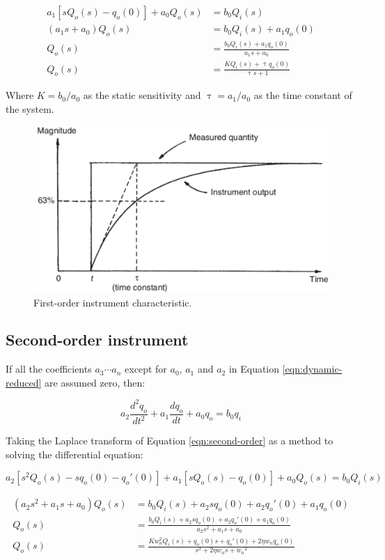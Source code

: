 \documentclass[a4paper,11pt]{book}
\begin{document}
\begin{align}
a_1 \left[ s Q_o(s) - q_o(0) \right] + a_0 Q_o(s) &= b_0 Q_i(s) \\ 
( a_1 s + a_0 ) Q_o(s) &= b_0 Q_i(s) + a_1 q_o(0) \\
Q_o(s) &= \frac{ b_0 Q_i(s) + a_1 q_o(0) }{ a_1 s + a_0 } \\
Q_o(s) &= \frac{ K Q_i(s) + \uptau q_o(0) }{ \uptau s + 1} \label{eqn:first-order-laplace}
\end{align}

Where $K = b_0/a_0$ as the static sensitivity and $\uptau = a_1/a_0$ as the time constant of the system.

\begin{figure}[h!]\label{fig:first-order}
\centering
  \includegraphics[width=0.7\linewidth]{first-order}
  \caption{First-order instrument characteristic.} 
\end{figure}

\subsection*{Second-order instrument}

If all the coefficients $a_3 \cdots a_n$ except for $a_0$, $a_1$ and $a_2$ in Equation \ref{eqn:dynamic-reduced} are assumed zero, then: 

\begin{equation}\label{eqn:second-order}
a_2 \frac{d^2q_o}{dt^2} + a_1 \frac{dq_o}{dt} + a_0 q_o = b_0 q_i  
\end{equation}

Taking the Laplace transform of Equation \ref{eqn:second-order} as a method to solving the differential equation:

\begin{equation}
a_2 \left[ s^2 Q_o(s) - s q_o(0) - q_o'(0) \right] + a_1 \left[ sQ_o(s) - q_o(0) \right] + a_0Q_o(s) = b_0 Q_i(s) 
\end{equation}

\begin{align} 
(a_2 s^2 + a_1 s + a_0 ) Q_o(s) &= b_0 Q_i(s) + a_2sq_o(0) + a_2 q_o'(0) + a_1 q_o(0) \\
Q_o(s) &= \frac{ b_0 Q_i(s) + a_2sq_o(0) + a_2 q_o'(0) + a_1 q_o(0) }{ a_2 s^2 + a_1 s + a_0 } \\
Q_o(s) &= \frac{ K w_n^2 Q_i(s) + q_o(0)s + q_o'(0) + 2 \eta w_n q_o(0) }{ s^2 + 2 \eta w_n s + {w_n}^2} \label{eqn:second-order-laplace}
\end{align}
\end{document}
